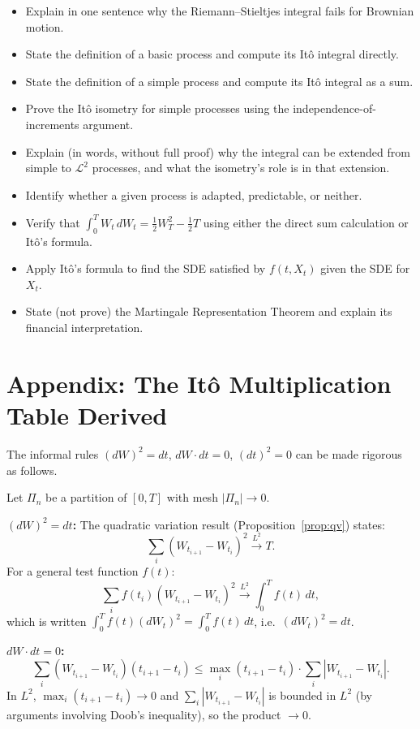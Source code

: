 \documentclass[11pt,a4paper]{article}
\theoremstyle{definition}
\theoremstyle{plain}
\theoremstyle{remark}
\newcommand{\calL}{\mathcal{L}}
\newcommand{\abs}[1]{\left|#1\right|}
\begin{document}
\begin{itemize}[label=$\square$]
  \item Explain in one sentence why the Riemann--Stieltjes integral fails for Brownian motion.
  \item State the definition of a basic process and compute its Itô integral directly.
  \item State the definition of a simple process and compute its Itô integral as a sum.
  \item Prove the Itô isometry for simple processes using the independence-of-increments argument.
  \item Explain (in words, without full proof) why the integral can be extended from simple to $\calL^2$ processes, and what the isometry's role is in that extension.
  \item Identify whether a given process is adapted, predictable, or neither.
  \item Verify that $\int_0^T W_t\,dW_t = \frac{1}{2}W_T^2 - \frac{1}{2}T$ using either the direct sum calculation or Itô's formula.
  \item Apply Itô's formula to find the SDE satisfied by $f(t, X_t)$ given the SDE for $X_t$.
  \item State (not prove) the Martingale Representation Theorem and explain its financial interpretation.
\end{itemize}

\appendix
\section{Appendix: The Itô Multiplication Table Derived}
\label{app:mult-table}

The informal rules $(dW)^2 = dt$, $dW\cdot dt = 0$, $(dt)^2 = 0$ can be made rigorous as follows.

Let $\Pi_n$ be a partition of $[0,T]$ with mesh $\abs{\Pi_n} \to 0$.

\textbf{$(dW)^2 = dt$:} The quadratic variation result (Proposition~\ref{prop:qv}) states:
\[
  \sum_{i} (W_{t_{i+1}} - W_{t_i})^2 \xrightarrow{L^2} T.
\]
For a general test function $f(t)$:
\[
  \sum_{i} f(t_i)(W_{t_{i+1}}-W_{t_i})^2 \xrightarrow{L^2} \int_0^T f(t)\,dt,
\]
which is written $\int_0^T f(t)(dW_t)^2 = \int_0^T f(t)\,dt$, i.e.\ $(dW_t)^2 = dt$.

\textbf{$dW \cdot dt = 0$:}
\[
  \sum_{i}(W_{t_{i+1}}-W_{t_i})(t_{i+1}-t_i) \leq \max_i(t_{i+1}-t_i)\cdot \sum_i\abs{W_{t_{i+1}}-W_{t_i}}.
\]
In $L^2$, $\max_i(t_{i+1}-t_i) \to 0$ and $\sum_i\abs{W_{t_{i+1}}-W_{t_i}}$ is bounded in $L^2$ (by arguments involving Doob's inequality), so the product $\to 0$.
\end{document}
